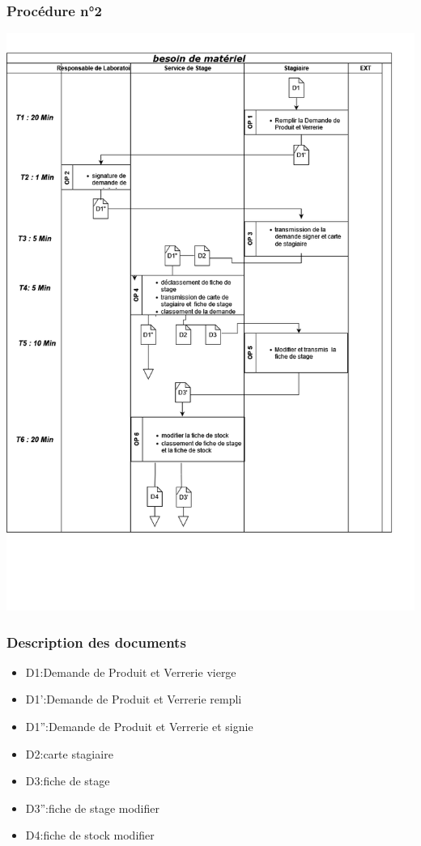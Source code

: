 \subsubsection*{Procédure n°2}
\includegraphics[width=1\textwidth]{chapter/Study of the Existing/EP/besoins.png}
\subsubsection*{Description des documents}
\begin{itemize}
    \item D1:Demande de Produit et Verrerie vierge 
    \item D1':Demande de Produit et Verrerie rempli
    \item D1'':Demande de Produit et Verrerie et signie
    \item D2:carte stagiaire
    \item D3:fiche de stage
    \item D3'':fiche de stage modifier
    \item D4:fiche de stock modifier
\end{itemize}


